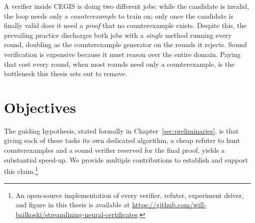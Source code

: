 A verifier inside CEGIS is doing two different jobs: while the candidate is invalid, the loop needs only a
\emph{counterexample} to train on; only once the candidate is finally valid
does it need a \emph{proof} that no counterexample exists. Despite this, the prevailing practice
discharges both jobs with a \emph{single} method running
every round, doubling as the counterexample generator on the rounds it
rejects. Sound verification is expensive because it must reason over
the entire domain. Paying that cost every round, when most rounds need
only a counterexample, is the bottleneck this thesis sets out to remove.

\section{Objectives}

The guiding hypothesis, stated formally in
Chapter~\ref{sec:preliminaries}, is that giving each of these tasks its own
dedicated algorithm, a cheap refuter to hunt counterexamples and a sound
verifier reserved for the final proof, yields a substantial speed-up.
We provide multiple contributions to establish and support this
claim.\footnote{An open-source implementation of every verifier,
refuter, experiment driver, and figure in this thesis is available at
\url{https://github.com/will-bailkoski/streamlining-neural-certificates}.}

